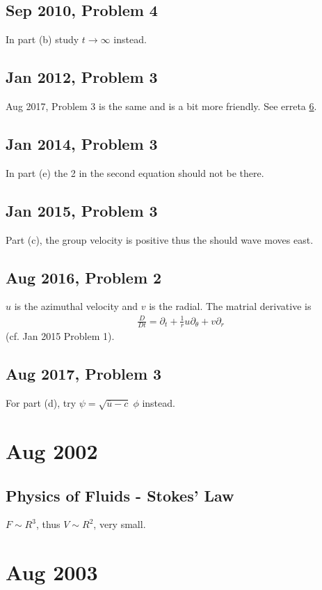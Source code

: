 \documentclass[11pt,letterpaper]{book}
\theoremstyle{definition}
\newcommand{\pe}{\partial}
\begin{document}
\section{Sep 2010, Problem 4}
In part (b) study $t\to \infty$ instead.

\section{Jan 2012, Problem 3}
Aug 2017, Problem 3 is the same and is a bit more friendly. See erreta \ref{err:aug_2017_3}. 

\section{Jan 2014, Problem 3}
In part (e) the 2 in the second equation should not be there.

\section{Jan 2015, Problem 3}\label{err:jan_2015_3}
Part (c), the group velocity is positive thus the should wave moves east.

\section{Aug 2016, Problem 2}
$u$ is the azimuthal velocity and $v$ is the radial. The matrial derivative is
\begin{align*}
    \frac{D}{Dt} = \pe_t+\frac{1}{r}u\pe_\theta+v\pe_r
\end{align*}
(cf. Jan 2015 Problem 1).

\section{Aug 2017, Problem 3}\label{err:aug_2017_3}
For part (d), try $\psi = \sqrt{\overline{u}-c}\;\phi$ instead.

\chapter{Aug 2002}
\section{Physics of Fluids - Stokes' Law}
$F\sim R^3$, thus $V\sim R^2$, very small.

\chapter{Aug 2003}
\end{document}
